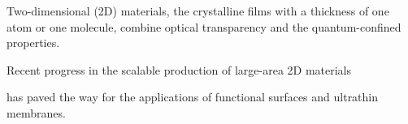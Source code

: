\documentclass[journal=ancac3,manuscript=article,email=true]{achemso}
\begin{document}
Two-dimensional (2D) materials, the crystalline films with a thickness
of one atom or one molecule, combine optical transparency and the
quantum-confined properties.
\begin{center}
\end{center}
Recent progress in the scalable production of large-area 2D materials
\begin{center}
\end{center}
has paved the way for the applications of functional surfaces and
ultrathin membranes.
\begin{center}
\end{center}
\end{document}
